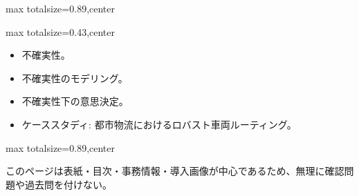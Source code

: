 \begin{minipage}[t]{0.58\textwidth}
\begin{adjustbox}{max totalsize={\textwidth}{0.89\textheight},center}
\begin{minipage}{\textwidth}
\end{minipage}
\end{adjustbox}
\end{minipage}


\clearpage
{}
\begin{minipage}[t]{0.405\textwidth}
\begin{adjustbox}{max totalsize={\textwidth}{0.43\textheight},center}
\begin{minipage}{\textwidth}\scriptsize
{}\begin{itemize}
\item 不確実性。
\item 不確実性のモデリング。
\item 不確実性下の意思決定。
\item ケーススタディ: 都市物流におけるロバスト車両ルーティング。
\end{itemize}
\end{minipage}
\end{adjustbox}
\end{minipage}\hfill
\begin{minipage}[t]{0.58\textwidth}
\begin{adjustbox}{max totalsize={\textwidth}{0.89\textheight},center}
\begin{minipage}{\textwidth}\scriptsize
{}このページは表紙・目次・事務情報・導入画像が中心であるため、無理に確認問題や過去問を付けない。
\end{minipage}
\end{adjustbox}
\end{minipage}


